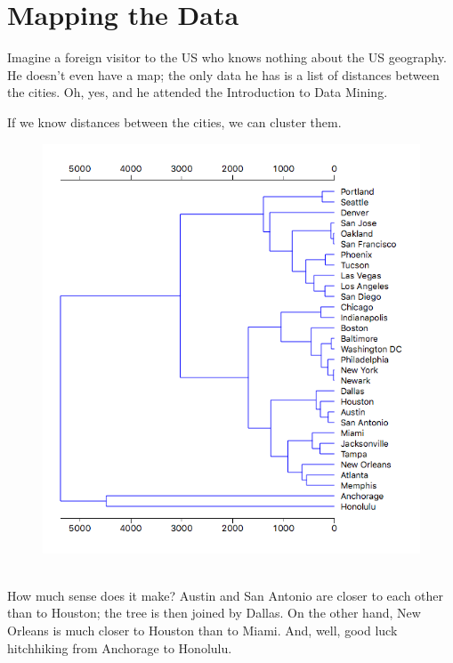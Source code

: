 \chapter{Mapping the Data}
\label{ch:mapping-the-data}

Imagine a foreign visitor to the US who knows nothing about the US geography. He doesn't even have a map; the only data he has is a list of distances between the cities. Oh, yes, and he attended the Introduction to Data Mining.

If we know distances between the cities, we can cluster them.

\begin{figure}[h]
    \centering
    \includegraphics[width=\linewidth]{dendrogram.png}
    \caption{$\;$}
\end{figure}

How much sense does it make? Austin and San Antonio are closer to each other than to Houston; the tree is then joined by Dallas. On the other hand, New Orleans is much closer to Houston than to Miami. And, well, good luck hitchhiking from Anchorage to Honolulu.

